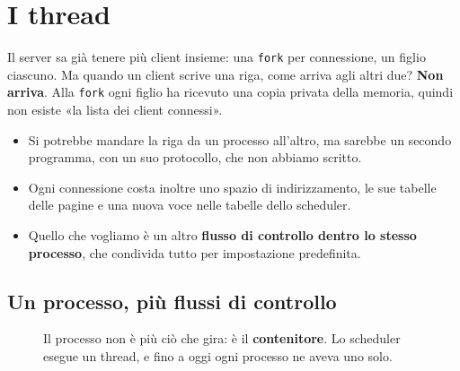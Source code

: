 \chapter{I thread}

Il server sa già tenere più client insieme: una \texttt{fork} per connessione, un figlio ciascuno. Ma quando un client
scrive una riga, come arriva agli altri due? \textbf{Non arriva}. Alla \texttt{fork} ogni figlio ha ricevuto una copia
privata della memoria, quindi non esiste «la lista dei client connessi».
\begin{itemize}
    \item Si potrebbe mandare la riga da un processo all'altro, ma sarebbe un secondo programma, con un suo protocollo, che
          non abbiamo scritto.
    \item Ogni connessione costa inoltre uno spazio di indirizzamento, le sue tabelle delle pagine e una nuova voce nelle
          tabelle dello scheduler.
    \item Quello che vogliamo è un altro \textbf{flusso di controllo dentro lo stesso processo}, che condivida tutto per
          impostazione predefinita.
\end{itemize}

\section{Un processo, più flussi di controllo}


\begin{figure}[H]
\centering
{}
\caption{Il processo non è più ciò che gira: è il \textbf{contenitore}. Lo scheduler esegue un thread, e fino a oggi ogni
         processo ne aveva uno solo.}
\end{figure}

